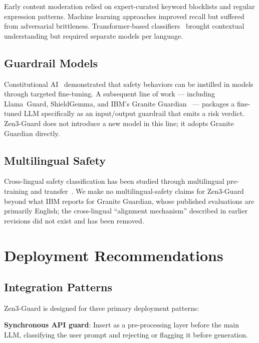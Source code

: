 \documentclass[11pt,a4paper]{article}
\begin{document}
Early content moderation relied on expert-curated keyword blocklists and regular
expression patterns. Machine learning approaches improved recall but suffered from
adversarial brittleness. Transformer-based classifiers~\cite{perspectiveapi} brought
contextual understanding but required separate models per language.

\subsection{Guardrail Models}

Constitutional AI~\cite{bai2022constitutional} demonstrated that safety behaviors can be
instilled in models through targeted fine-tuning. A subsequent line of work --- including
Llama~Guard, ShieldGemma, and IBM's Granite Guardian~\cite{graniteguardian} --- packages a
fine-tuned LLM specifically as an input/output guardrail that emits a risk verdict.
Zen3-Guard does not introduce a new model in this line; it adopts Granite Guardian directly.

\subsection{Multilingual Safety}

Cross-lingual safety classification has been studied through multilingual pre-training and
transfer~\cite{multilingual-safety}. We make no multilingual-safety claims for Zen3-Guard
beyond what IBM reports for Granite Guardian, whose published evaluations are primarily
English; the cross-lingual ``alignment mechanism'' described in earlier revisions did not
exist and has been removed.

\section{Deployment Recommendations}
\label{sec:deploy}

\subsection{Integration Patterns}

Zen3-Guard is designed for three primary deployment patterns:

\textbf{Synchronous API guard}: Insert as a pre-processing layer before the main
LLM, classifying the user prompt and rejecting or flagging it before generation.
\end{document}
